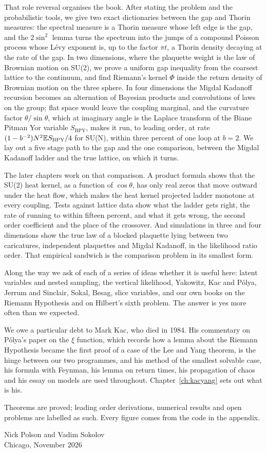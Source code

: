 That role reversal organises the book. After stating the problem and the probabilistic tools, we give two exact dictionaries between the gap and Thorin measures: the spectral measure is a Thorin measure whose left edge is the gap, and the $2\sin^2$ lemma turns the spectrum into the jumps of a compound Poisson process whose L\'evy exponent is, up to the factor $\pi t$, a Thorin density decaying at the rate of the gap. In two dimensions, where the plaquette weight is the law of Brownian motion on SU(2), we prove a uniform gap inequality from the coarsest lattice to the continuum, and find Riemann's kernel $\Phi$ inside the return density of Brownian motion on the three sphere. In four dimensions the Migdal Kadanoff recursion becomes an alternation of Bayesian products and convolutions of laws on the group; flat space would leave the coupling marginal, and the curvature factor $\theta/\sin\theta$, which at imaginary angle is the Laplace transform of the Biane Pitman Yor variable $S_{\mathrm{BPY}}$, makes it run, to leading order, at rate $(1-b^{-2})N^2\mathbb{E} S_{\mathrm{BPY}}/4$ for SU(N), within three percent of one loop at $b=2$. We lay out a five stage path to the gap and the one comparison, between the Migdal Kadanoff ladder and the true lattice, on which it turns.

The later chapters work on that comparison. A product formula shows that the SU(2) heat kernel, as a function of $\cos\theta$, has only real zeros that move outward under the heat flow, which makes the heat kernel projected ladder monotone at every coupling. Tests against lattice data show what the ladder gets right, the rate of running to within fifteen percent, and what it gets wrong, the second order coefficient and the place of the crossover. And simulations in three and four dimensions show the true law of a blocked plaquette lying between two caricatures, independent plaquettes and Migdal Kadanoff, in the likelihood ratio order. That empirical sandwich is the comparison problem in its smallest form.

Along the way we ask of each of a series of ideas whether it is useful here: latent variables and nested sampling, the vertical likelihood, Yakowitz, Kac and P\'olya, Jerrum and Sinclair, Sokal, Besag, slice variables, and our own books on the Riemann Hypothesis and on Hilbert's sixth problem. The answer is yes more often than we expected.

We owe a particular debt to Mark Kac, who died in 1984. His commentary on P\'olya's paper on the $\xi$ function, which records how a lemma about the Riemann Hypothesis became the first proof of a case of the Lee and Yang theorem, is the hinge between our two programmes, and his method of the smallest solvable case, his formula with Feynman, his lemma on return times, his propagation of chaos and his essay on models are used throughout. Chapter~\ref{ch:kacyang} sets out what is his.

Theorems are proved; leading order derivations, numerical results and open problems are labelled as such. Every figure comes from the code in the appendix.

\vspace{1em}
\noindent Nick Polson and Vadim Sokolov\\
Chicago, November 2026
